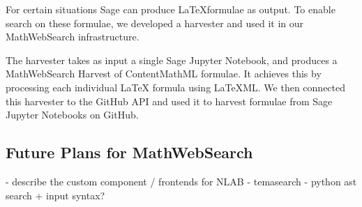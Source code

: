 For certain situations Sage can produce \LaTeX formulae as output. 
To enable search on these formulae, we developed a harvester and used it in our MathWebSearch infrastructure. 

The harvester takes as input a single Sage Jupyter Notebook, and produces a MathWebSearch Harvest of ContentMathML formulae. 
It achieves this by processing each individual LaTeX formula using LaTeXML. 
We then connected this harvester to the GitHub API and used it to harvest formulae from  Sage Jupyter Notebooks on GitHub. 


\subsection{Future Plans for MathWebSearch}

- describe the custom component / frontends for NLAB
- temasearch
- python ast search + input syntax?


